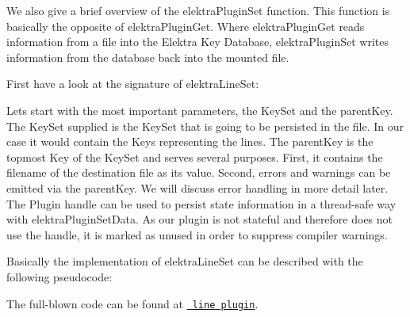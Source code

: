 We also give a brief overview of the {\ttfamily elektra\+Plugin\+Set} function. This function is basically the opposite of {\ttfamily elektra\+Plugin\+Get}. Where {\ttfamily elektra\+Plugin\+Get} reads information from a file into the Elektra Key Database, {\ttfamily elektra\+Plugin\+Set} writes information from the database back into the mounted file.

First have a look at the signature of {\ttfamily elektra\+Line\+Set}\+:


\begin{DoxyCode}{0}
\end{DoxyCode}


Lets start with the most important parameters, the {\ttfamily Key\+Set} and the {\ttfamily parent\+Key}. The {\ttfamily Key\+Set} supplied is the {\ttfamily Key\+Set} that is going to be persisted in the file. In our case it would contain the Keys representing the lines. The {\ttfamily parent\+Key} is the topmost {\ttfamily Key} of the {\ttfamily Key\+Set} and serves several purposes. First, it contains the filename of the destination file as its value. Second, errors and warnings can be emitted via the {\ttfamily parent\+Key}. We will discuss error handling in more detail later. The Plugin handle can be used to persist state information in a thread-\/safe way with {\ttfamily elektra\+Plugin\+Set\+Data}. As our plugin is not stateful and therefore does not use the handle, it is marked as unused in order to suppress compiler warnings.

Basically the implementation of {\ttfamily elektra\+Line\+Set} can be described with the following pseudocode\+:


\begin{DoxyCode}{0}
\DoxyCodeLine{\textcolor{comment}{// open the file}}
\DoxyCodeLine{\{}
\DoxyCodeLine{\}}
\DoxyCodeLine{\textcolor{keywordflow}{for} (\textcolor{comment}{/* each key */})}
\DoxyCodeLine{\{}
\DoxyCodeLine{        \textcolor{comment}{// write the key value together with a newline}}
\DoxyCodeLine{\}}
\DoxyCodeLine{\textcolor{comment}{// close the file}}
\end{DoxyCode}


The full-\/blown code can be found at \href{https://master.libelektra.org/src/plugins/line/line.c}{\texttt{ line plugin}}.

